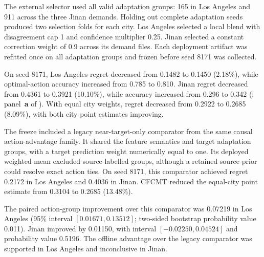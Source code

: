 The external selector used all valid adaptation groups: 165 in Los Angeles and
911 across the three Jinan demands.  Holding out complete adaptation seeds
produced two selection folds for each city.  Los Angeles selected a local blend
with disagreement cap 1 and confidence multiplier 0.25.  Jinan selected a
constant correction weight of 0.9 across its demand files.  Each deployment
artifact was refitted once on all adaptation groups and frozen before seed
8171 was collected.

On seed 8171, Los Angeles regret decreased from 0.1482 to 0.1450 (2.18\%),
while optimal-action accuracy increased from 0.785 to 0.810.  Jinan regret
decreased from 0.4361 to 0.3921 (10.10\%), while accuracy increased from 0.296
to 0.342 (; panel~\textbf{a} of
).  With equal city weights, regret decreased
from 0.2922 to 0.2685 (8.09\%), with both city point estimates improving.

The freeze included a legacy near-target-only comparator from the same causal
action-advantage family.  It shared the feature semantics and target adaptation
groups, with a target prediction weight numerically equal to one.  Its deployed
weighted mean excluded source-labelled groups, although a retained source
prior could resolve exact action ties.  On seed 8171, this comparator achieved
regret 0.2172 in Los Angeles and 0.4036 in Jinan.  CFCMT reduced the equal-city
point estimate from 0.3104 to 0.2685 (13.48\%).

The paired action-group improvement over this comparator was 0.07219 in Los
Angeles (95\% interval $[0.01671,0.13512]$; two-sided bootstrap probability
value 0.011).  Jinan improved by 0.01150, with interval $[-0.02250,0.04524]$
and probability value 0.5196.  The offline advantage over the legacy comparator
was supported in Los Angeles and inconclusive in Jinan.

\begin{table}[t]
\caption{External seed-8171 offline confirmation after city-specific method
freeze.  The legacy near-target-only arm shares the causal action-ranking
family and target groups.  Its weighted mean has zero deployed source weight,
but exact ties retain a source prior.  Adaptation counterfactuals come from
seeds 5057 and 6067; held-out groups are excluded from fitting and selection.
Table gains compare CFCMT with the arm labelled target only.}
\label{tab:external-offline}
\centering
\scriptsize
\resizebox{\textwidth}{!}{}
\end{table}


